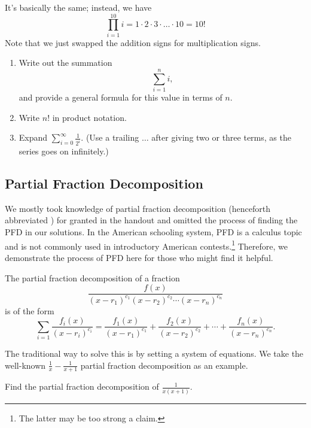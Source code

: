 \documentclass[mast]{lucky}
\begin{document}
\begin{sol}
It's basically the same; instead, we have $$\prod\limits_{i=1}^{10} i=1\cdot 2\cdot 3\cdot \dots \cdot 10=10!$$ Note that we just swapped the addition signs for multiplication signs.
\end{sol}

\begin{exer}\hfill
\begin{enumerate}
    \item Write out the summation $$\sum\limits_{i=1}^{n} i,$$ and provide a general formula for this value in terms of $n.$
    
    \item Write $n!$ in product notation.

    \item Expand $\sum\limits_{i=0}^{\infty} \frac{1}{2^i}.$ (Use a trailing $\dots$ after giving two or three terms, as the series goes on infinitely.)
\end{enumerate}
\end{exer}

\subsection{Partial Fraction Decomposition}

We mostly took knowledge of partial fraction decomposition (henceforth abbreviated ) for granted in the handout and omitted the process of finding the PFD in our solutions. In the American schooling system, PFD is a calculus topic and is not commonly used in introductory American contests.\footnote{The latter may be too strong a claim.} Therefore, we demonstrate the process of PFD here for those who might find it helpful.

\begin{defi}
The partial fraction decomposition of a fraction
\[\frac{f(x)}{(x-r_1)^{c_1}(x-r_2)^{c_2}\cdots (x-r_n)^{c_n}}\]
is of the form
\[\sum_{i=1}\frac{f_i(x)}{(x-r_i)^{c_i}}=\frac{f_1(x)}{(x-r_1)^{c_1}}+\frac{f_2(x)}{(x-r_2)^{c_2}}+\cdots+\frac{f_n(x)}{(x-r_n)^{c_n}}.\]
\end{defi}

The traditional way to solve this is by setting a system of equations. We take the well-known $\frac{1}{x}-\frac{1}{x+1}$ partial fraction decomposition as an example.

\begin{exam}
Find the partial fraction decomposition of $\frac{1}{x(x+1)}.$
\end{exam}
\end{document}
